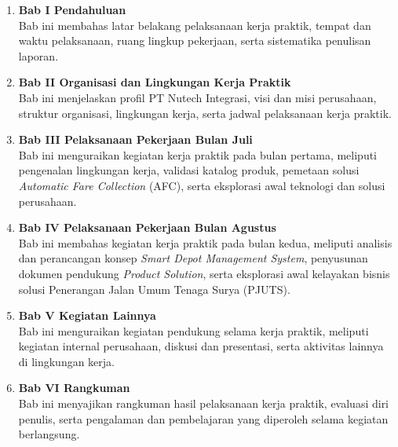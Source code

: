 \begin{enumerate}
    \item \textbf{Bab I Pendahuluan}\\
    Bab ini membahas latar belakang pelaksanaan kerja praktik, tempat dan waktu pelaksanaan, ruang lingkup pekerjaan, serta sistematika penulisan laporan.

    \item \textbf{Bab II Organisasi dan Lingkungan Kerja Praktik}\\
    Bab ini menjelaskan profil PT Nutech Integrasi, visi dan misi perusahaan, struktur organisasi, lingkungan kerja, serta jadwal pelaksanaan kerja praktik.

    \item \textbf{Bab III Pelaksanaan Pekerjaan Bulan Juli}\\
    Bab ini menguraikan kegiatan kerja praktik pada bulan pertama, meliputi pengenalan lingkungan kerja, validasi katalog produk, pemetaan solusi \textit{Automatic Fare Collection} (AFC), serta eksplorasi awal teknologi dan solusi perusahaan.

    \item \textbf{Bab IV Pelaksanaan Pekerjaan Bulan Agustus}\\
    Bab ini membahas kegiatan kerja praktik pada bulan kedua, meliputi analisis dan perancangan konsep \textit{Smart Depot Management System}, penyusunan dokumen pendukung \textit{Product Solution}, serta eksplorasi awal kelayakan bisnis solusi Penerangan Jalan Umum Tenaga Surya (PJUTS).

    \item \textbf{Bab V Kegiatan Lainnya}\\
    Bab ini menguraikan kegiatan pendukung selama kerja praktik, meliputi kegiatan internal perusahaan, diskusi dan presentasi, serta aktivitas lainnya di lingkungan kerja.

    \item \textbf{Bab VI Rangkuman}\\
    Bab ini menyajikan rangkuman hasil pelaksanaan kerja praktik, evaluasi diri penulis, serta pengalaman dan pembelajaran yang diperoleh selama kegiatan berlangsung.
\end{enumerate}
